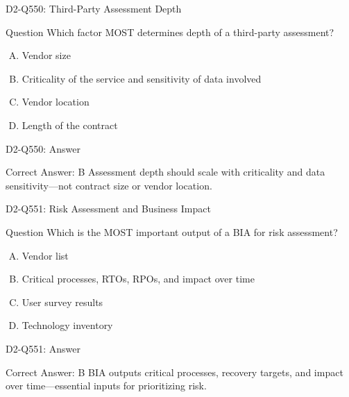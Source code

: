 \documentclass{beamer}
\begin{document}
	\begin{frame}{D2-Q550: Third-Party Assessment Depth}
		\begin{block}{Question}
			Which factor MOST determines depth of a third-party assessment?
		\end{block}
		\begin{enumerate}[(A)]
			\item Vendor size
			\item Criticality of the service and sensitivity of data involved
			\item Vendor location
			\item Length of the contract
		\end{enumerate}
	\end{frame}
	\begin{frame}{D2-Q550: Answer}
		\begin{block}{Correct Answer: B}
			Assessment depth should scale with criticality and data sensitivity—not contract size or vendor location.
		\end{block}
	\end{frame}
	
	\begin{frame}{D2-Q551: Risk Assessment and Business Impact}
		\begin{block}{Question}
			Which is the MOST important output of a BIA for risk assessment?
		\end{block}
		\begin{enumerate}[(A)]
			\item Vendor list
			\item Critical processes, RTOs, RPOs, and impact over time
			\item User survey results
			\item Technology inventory
		\end{enumerate}
	\end{frame}
	\begin{frame}{D2-Q551: Answer}
		\begin{block}{Correct Answer: B}
			BIA outputs critical processes, recovery targets, and impact over time—essential inputs for prioritizing risk.
		\end{block}
	\end{frame}
	
\end{document}
